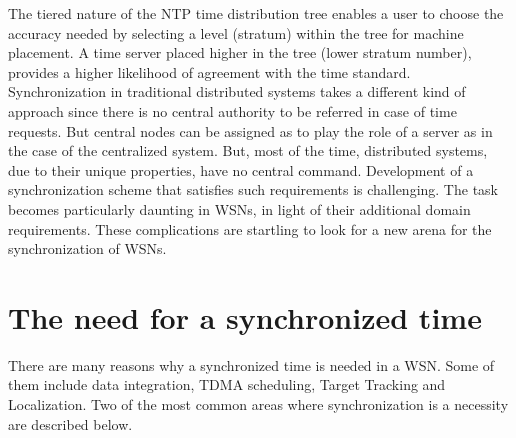\documentclass[a4paper,10pt]{report}
\begin{document}
The tiered nature of the NTP time distribution tree enables a user to choose the accuracy needed by selecting a level (stratum) within
the tree for machine placement. A time server placed higher in the tree (lower stratum number), provides a higher likelihood of
agreement with the  time standard.
\newline
Synchronization in traditional distributed systems takes a different kind of approach since there is no central authority to be referred
in case of time requests. But central nodes can be assigned as to play the role of a server as in the case of the centralized system.
But, most of the time, distributed systems, due to their unique properties, have no central command. Development of a synchronization
scheme that satisfies such requirements is challenging. The task becomes particularly daunting in WSNs, in light of their additional
domain requirements. These complications are startling to look for a new arena for the synchronization of WSNs.
\section{\textbf{The need for a synchronized time}}
There are many reasons why a synchronized time is needed in a WSN. Some of them include data integration, TDMA scheduling, Target
Tracking and Localization. Two of the most common areas where synchronization is a necessity are described below. 
\end{document}
